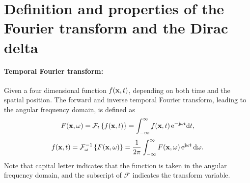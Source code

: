 \section{Definition and properties of the Fourier transform and the Dirac delta}
\label{App:Fourier_def}

\paragraph{Temporal Fourier transform:} 
Given a four dimensional function $f(\mathbf{x},t)$, depending on both time and the spatial position.
The forward and inverse temporal Fourier transform, leading to the angular frequency domain, is defined as 
\begin{equation}
\label{eq:temporal_fourier_transform_def}
F(\vx,\omega) = \FT[t]{f(\vx,t)} = \int_{-\infty}^{\infty} f(\vx,t) \, \te^{-\ti \omega t} \td t,
\end{equation}
\begin{equation}
\label{eq:temporal_inverse_fourier_transform_def}
f(\vx,t) = \IFT[\omega]{F(\vx,\omega)} = \frac{1}{2\pi} \int_{-\infty}^{\infty} F(\vx,\omega) \, \te^{ \ti \omega t} \, \td \omega.
\end{equation}
Note that capital letter indicates that the function is taken in the angular frequency domain, and the subscript of $\mathcal{F}$ indicates the transform variable.
%
